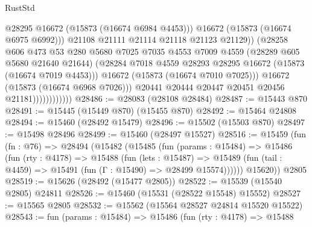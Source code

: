 \begin{lexlean}{RustStd}
\begin{coremodule}
                                      @28295
                                      @16672
                                      (@15873 (@16674 @6984 @4453)))
                                    @16672
                                    (@15873 (@16674 @6975 @6992)))
                                  @21108
                                  @21111
                                  @21114
                                  @21118
                                  @21123
                                  @21129))
                              (@28258
                                @606
                                @473
                                @53
                                @280
                                @5680
                                @7025
                                @7035
                                @4553
                                @7009
                                @4559
                                (@28289 @605 @5680 @21640 @21644)
                                (@28284
                                  @7018
                                  @4559
                                  @28293
                                  @28295
                                  @16672
                                  (@15873 (@16674 @7019 @4453)))
                                @16672
                                (@15873 (@16674 @7010 @7025)))
                              @16672
                              (@15873 (@16674 @6968 @7026)))
                            @20441
                            @20444
                            @20447
                            @20451
                            @20456
                            @21181))))))))))))
@28486 := @28083 (@28108 @28484)
@28487 := @15443 @870
@28491 := @15445 (@15449 @870) (@15455 @870)
@28492 := @15464 @24808
@28494 := @15460 (@28492 @15479)
@28496 := @15502 (@15503 @870)
@28497 := @15498 @28496
@28499 := @15460 (@28497 @15527)
@28516 := @15459
    (fun (fn : @76) =>
    @28494
      (@15482
        (@15485
          (fun (params : @15484) =>
          @15486
            (fun (rty : @4178) =>
            @15488
              (fun (lets : @15487) =>
              @15489 (fun (tail : @4459) => @15491 (fun (Γ : @15490) => @28499 @15574))))))
        @15620))
    @2805
@28519 := @15626 (@28492 (@15477 @2805))
@28522 := @15539 (@15540 @2805) @24811
@28526 := @15460 (@15531 (@28522 @15548) @15552)
@28527 := @15565 @2805
@28532 := @15562 (@15564 @28527 @24814 @15520 @15522)
@28543 := fun (params : @15484) =>
  @15486
    (fun (rty : @4178) =>
    @15488

\end{coremodule}
\end{lexlean}
